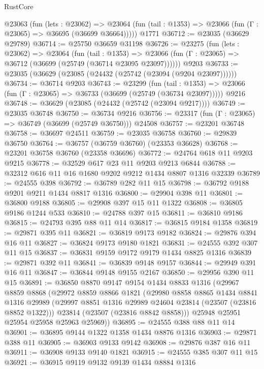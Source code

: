 \begin{lexlean}{RustCore}
\begin{coremodule}
    @23063
      (fun (lets : @23062) =>
      @23064 (fun (tail : @1353) => @23066 (fun (Γ : @23065) => @36695 (@36699 @36664)))))
    @1771
@36712 := @23035 (@36629 @29789)
@36714 := @25750 @36659 @31198
@36726 := @23275
    (fun (lets : @23062) =>
    @23064
      (fun (tail : @1353) =>
      @23066 (fun (Γ : @23065) => @36712 (@36699 (@25749 (@36714 @23095 @23097))))))
    @9203
@36733 := @23035 (@36629 (@23085 (@24432 (@25742 (@23094 (@9204 @23097))))))
@36734 := @36714 @9203
@36743 := @23299
    (fun (tail : @1353) => @23066 (fun (Γ : @23065) => @36733 (@36699 (@25749 (@36734 @23097)))))
    @9216
@36748 := @36629 (@23085 (@24432 (@25742 (@23094 @9217))))
@36749 := @23035 @36748
@36750 := @36734 @9216
@36756 := @23317 (fun (Γ : @23065) => @36749 (@36699 (@25749 @36750))) @24508
@36757 := @23201 @36748
@36758 := @36697 @24511
@36759 := @23035 @36758
@36760 := @29839 @36750
@36764 := @36757 (@36759 @36760) (@23353 @36628)
@36768 := @23201 @36758 @36760 (@23358 @36696)
@36772 := @24764 @618 @11 @9203 @9215
@36778 := @32529 @617 @23 @11 @9203 @9213 @6844
@36788 := @32312 @616 @11 @16 @1680 @9202 @9212 @1434 @8807 @1316 @32339
@36789 := @24555 @398
@36792 := @36789 @282 @11 @15
@36798 := @36792 @9188 @9201 @9211 @1434 @8817 @1316
@36800 := @29904 @398 @11
@36801 := @36800 @9188
@36805 := @29908 @397 @15 @11 @1322
@36808 := @36805 @9186 @1244 @533
@36810 := @24788 @397 @15
@36811 := @36810 @9186
@36815 := @24793 @395 @88 @11 @14
@36817 := @36815 @9184 @1358
@36819 := @29871 @395 @11
@36821 := @36819 @9173 @9182
@36824 := @29876 @394 @16 @11
@36827 := @36824 @9173 @9180 @1821
@36831 := @24555 @392 @307 @11 @15
@36837 := @36831 @9159 @9172 @9179 @1434 @8825 @1316
@36839 := @29871 @392 @11
@36841 := @36839 @9148 @9157
@36844 := @29949 @391 @16 @11
@36847 := @36844 @9148 @9155 @2167
@36850 := @29956 @390 @11 @15
@36891 := @36850
    @8870
    @9147
    @9154
    @1434
    @8833
    @1316
    (@29967
      @8859
      @8868
      (@29972
        @8859
        @8866
        @1821
        (@29980
          @8858
          @8865
          @1434
          @8841
          @1316
          @29989
          (@29997 @8851 @1316 @29989 @24604 @23814 (@23507 (@23816 @8852 @1322)))
          @23814
          (@23507 (@23816 @8842 @8858)))
        @25948
        @25951
        @25954
        @25958
        @25963
        @25969))
@36895 := @24555 @388 @88 @11 @14
@36901 := @36895 @9144 @1322 @1358 @1434 @8876 @1316
@36903 := @29871 @388 @11
@36905 := @36903 @9133 @9142
@36908 := @29876 @387 @16 @11
@36911 := @36908 @9133 @9140 @1821
@36915 := @24555 @385 @307 @11 @15
@36921 := @36915 @9119 @9132 @9139 @1434 @8884 @1316

\end{coremodule}
\end{lexlean}
